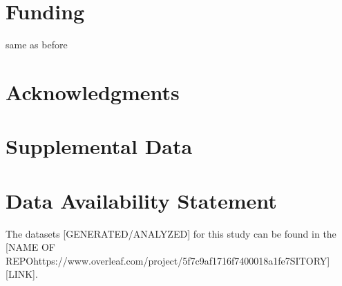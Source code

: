 \documentclass[utf8]{frontiersSCNS} %
\begin{document}
\section*{Funding}
same as before

\section*{Acknowledgments}

\section*{Supplemental Data}

\section*{Data Availability Statement}
The datasets [GENERATED/ANALYZED] for this study can be found in the [NAME OF REPOhttps://www.overleaf.com/project/5f7c9af1716f7400018a1fe7SITORY] [LINK].



\end{document}
